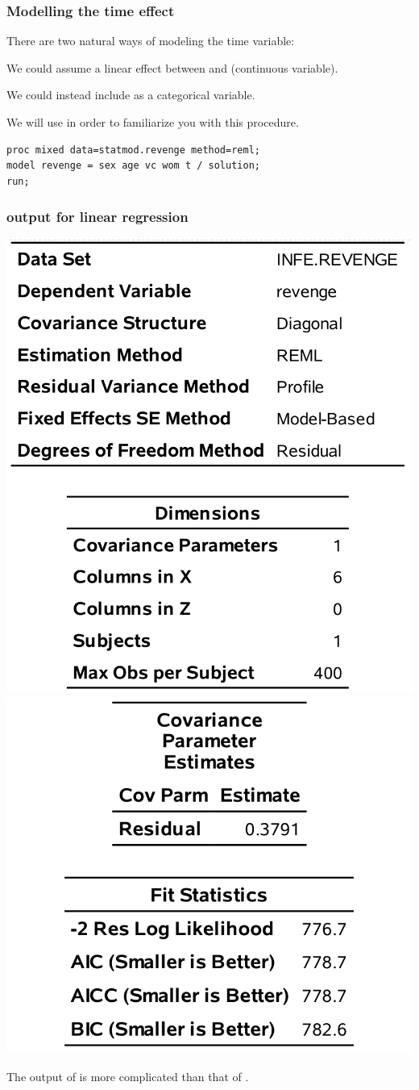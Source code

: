\documentclass{beamer}
\begin{document}
\begin{frame}[fragile]
\frametitle{Modelling the time effect}
\bi
\item There are two natural ways of modeling the time variable:
\bi

\item We could assume a linear effect between  and  (continuous variable).
\item We could instead include  as a categorical variable.
\ei

\item  We will use  in order to familiarize you with this procedure.
 \ei

\begin{tcolorbox}[colback=white, colframe=hecblue, title=\SASlang{} code to fit a linear model]
\begin{verbatim}
proc mixed data=statmod.revenge method=reml;
model revenge = sex age vc wom t / solution;
run;
\end{verbatim}
\end{tcolorbox}
\end{frame}
 \begin{frame}
\frametitle{ output for linear regression}
\begin{center}
\includegraphics[width = 0.45\linewidth]{img/c5/slides6-e03}
\includegraphics[width = 0.45\linewidth]{img/c5/slides6-e04}
\end{center}
{\footnotesize
The output of  is more complicated than that of . 


}
\end{frame}
\end{document}
